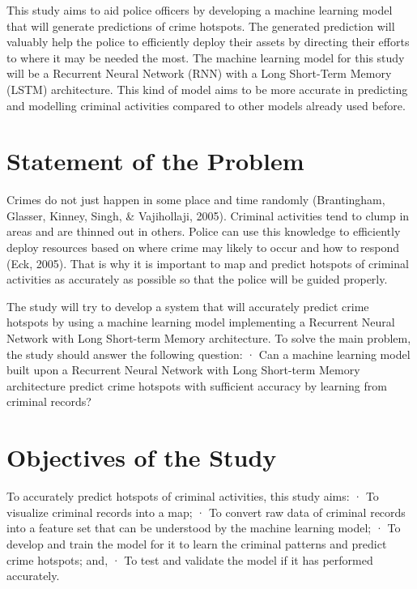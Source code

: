     This study aims to aid police officers by developing a machine learning model that will generate predictions of crime hotspots. The generated prediction will valuably help the police to efficiently deploy their assets by directing their efforts to where it may be needed the most. The machine learning model for this study will be a Recurrent Neural Network (RNN) with a Long Short-Term Memory (LSTM) architecture. This kind of model aims to be more accurate in predicting and modelling criminal activities compared to other models already used before.

\section{Statement of the Problem} %

    Crimes do not just happen in some place and time randomly (Brantingham, Glasser, Kinney, Singh, \& Vajihollaji, 2005). Criminal activities tend to clump in areas and are thinned out in others. Police can use this knowledge to efficiently deploy resources based on where crime may likely to occur and how to respond (Eck, 2005). That is why it is important to map and predict hotspots of criminal activities as accurately as possible so that the police will be guided properly.

    The study will try to develop a system that will accurately predict crime hotspots by using a machine learning model implementing a Recurrent Neural Network with Long Short-term Memory architecture. To solve the main problem, the study should answer the following question:
        ·  Can a machine learning model built upon a Recurrent Neural Network with Long Short-term Memory architecture predict crime hotspots with sufficient accuracy by learning from criminal records?

\section{Objectives of the Study} %

To accurately predict hotspots of criminal activities, this study aims:
·         To visualize criminal records into a map;
·         To convert raw data of criminal records into a feature set that can be understood by the machine learning model;
·         To develop and train the model for it to learn the criminal patterns and predict crime hotspots; and,
·         To test and validate the model if it has performed accurately.

